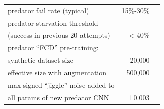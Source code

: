 \documentclass[acmtog,
    anonymous,
    review
    ]{acmart}
\begin{document}
\begin{minipage}{\linewidth}
\begin{minipage}{\linewidth-1.1cm}
\begin{table}[H]
\begin{tabular}{ |l|r|r| }
predator fail rate (typical) & 15\%-30\% & \\
predator starvation threshold & & \\
\hspace{0.2cm}(success in previous 20 attempts) & < 40\% & \\ 
\hline
predator “FCD” pre-training: & & \\
\hspace{0.2cm} synthetic dataset size & 20,000 & \\
\hspace{0.2cm} effective size with augmentation & 500,000 & \\
\hline
max signed “jiggle” noise added to  & & \\
\hspace{0.2cm} all params of new predator CNN & ±0.003 & \\
\hline
\end{tabular}
\label{table:key_simulation_parameters}
\end{table}
\end{minipage}
\end{minipage}
\end{document}
